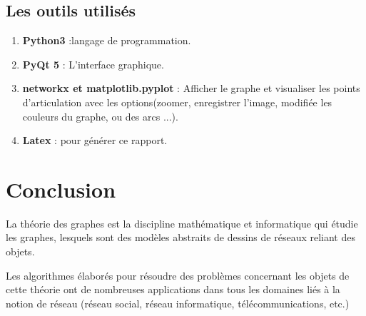 \documentclass[12pt]{report}
\begin{document}
	\section{Les outils utilisés}
	\begin{enumerate}
		\item \textbf{Python3} :langage de programmation. 
		\item \textbf{PyQt 5} : L'interface graphique.
		\item \textbf{networkx et matplotlib.pyplot} : Afficher le graphe et visualiser les points d'articulation avec les options(zoomer, enregistrer l'image, modifiée les couleurs du graphe, ou des arcs ...).
		\item \textbf{Latex} : pour générer ce rapport.
		
\end{enumerate}	
	\chapter{Conclusion} 
      La théorie des graphes est la discipline mathématique et informatique qui étudie les graphes, lesquels sont des modèles abstraits de dessins de réseaux reliant des objets.
\newline
	\par{}
      Les algorithmes élaborés pour résoudre des problèmes concernant les objets de cette théorie ont de nombreuses applications dans tous les domaines liés à la notion de réseau (réseau social, réseau informatique, télécommunications, etc.) 
	
	
	
	
\end{document}
